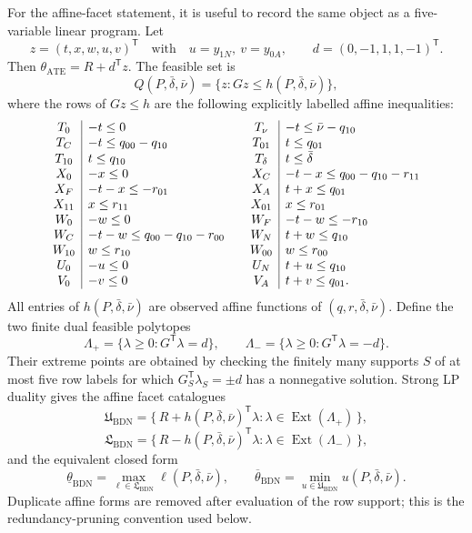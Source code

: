 \documentclass[11pt]{article}
\newcommand{\transpose}{\mathsf{T}}
\theoremstyle{definition}
\theoremstyle{plain}
\theoremstyle{remark}
\begin{document}
For the affine-facet statement, it is useful to record the same object as a
five-variable linear program.  Let
\[
z=(t,x,w,u,v)^{\transpose}
\quad\text{with}\quad u=y_{1N},\ v=y_{0A},\qquad
d=(0,-1,1,1,-1)^{\transpose}.
\]
Then \(\theta_{\mathrm{ATE}}=R+d^{\transpose}z\).  The feasible set is
\[
Q(P,\bar\delta,\bar\nu)=\{z:Gz\le h(P,\bar\delta,\bar\nu)\},
\]
where the rows of \(Gz\le h\) are the following explicitly labelled affine
inequalities:
\[
\begin{array}{c|l@{\qquad}c|l}
T_0&-t\le0&
T_\nu&-t\le\bar\nu-q_{10}\\
T_C&-t\le q_{00}-q_{10}&
T_{01}&t\le q_{01}\\
T_{10}&t\le q_{10}&
T_\delta&t\le\bar\delta\\
X_0&-x\le0&
X_C&-t-x\le q_{00}-q_{10}-r_{11}\\
X_F&-t-x\le -r_{01}&
X_A&t+x\le q_{01}\\
X_{11}&x\le r_{11}&
X_{01}&x\le r_{01}\\
W_0&-w\le0&
W_F&-t-w\le -r_{10}\\
W_C&-t-w\le q_{00}-q_{10}-r_{00}&
W_N&t+w\le q_{10}\\
W_{10}&w\le r_{10}&
W_{00}&w\le r_{00}\\
U_0&-u\le0&
U_N&t+u\le q_{10}\\
V_0&-v\le0&
V_A&t+v\le q_{01}.
\end{array}
\]
All entries of \(h(P,\bar\delta,\bar\nu)\) are observed affine functions of
\((q,r,\bar\delta,\bar\nu)\).  Define the two finite dual feasible polytopes
\[
\Lambda_+=\{\lambda\ge0:G^{\transpose}\lambda=d\},\qquad
\Lambda_-=\{\lambda\ge0:G^{\transpose}\lambda=-d\}.
\]
Their extreme points are obtained by checking the finitely many supports
\(S\) of at most five row labels for which \(G_S^{\transpose}\lambda_S=\pm d\)
has a nonnegative solution.  Strong LP duality gives the affine facet
catalogues
\[
\mathfrak{U}_{\mathrm{BDN}}
=\{\,R+h(P,\bar\delta,\bar\nu)^{\transpose}\lambda:
\lambda\in\operatorname{Ext}(\Lambda_+)\,\},
\]
\[
\mathfrak{L}_{\mathrm{BDN}}
=\{\,R-h(P,\bar\delta,\bar\nu)^{\transpose}\lambda:
\lambda\in\operatorname{Ext}(\Lambda_-)\,\},
\]
and the equivalent closed form
\[
\underline\theta_{\mathrm{BDN}}
=\max_{\ell\in\mathfrak{L}_{\mathrm{BDN}}}\ell(P,\bar\delta,\bar\nu),
\qquad
\overline\theta_{\mathrm{BDN}}
=\min_{u\in\mathfrak{U}_{\mathrm{BDN}}}u(P,\bar\delta,\bar\nu).
\]
Duplicate affine forms are removed after evaluation of the row support; this
is the redundancy-pruning convention used below.
\end{document}
